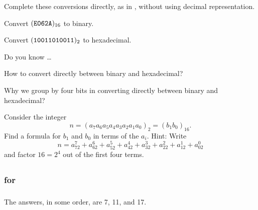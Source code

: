 \begin{exer}[\exerU] %
\label{exer_conv_binary_hex}
    Complete these conversions directly, as in , without using decimal representation.
    \begin{exerpart}
        \item Convert $ (\texttt{E062A})_{16}$ to binary.  
        \item Convert $(\texttt{10011010011})_2$ to hexadecimal.
    \end{exerpart}
\end{exer}

\begin{exer}[\exerR] %
\label{exer_dyk_bin_hex}
    Do you know \ldots
        \begin{exerpart}
            \item How to convert directly between binary and hexadecimal?
            \item Why we group by four bits in converting directly between binary and hexadecimal?
        \end{exerpart}
\end{exer}

\begin{exer}[\exerE] %
\label{exer_why_group4_binhex_works}
    Consider the integer $$n = (a_7a_6a_5a_4a_3a_2a_1a_0)_2 = (b_1b_0)_{16}.$$  
    Find a formula for $b_1$ and $b_0$ in terms of the $a_i$.  Hint: Write
        $$n=a_72^7+a_62^6+a_52^5+a_42^4+a_32^3+a_22^2+a_12^1+a_02^0$$ 
    and factor $16=2^4$ out of the first four terms.
\end{exer}

\subsection{\answers}

\subsubsection{\answers for 
\subbaseb}

\subsubsection*{ \answers}
The answers, in some order, are 7, 11, and 17.

